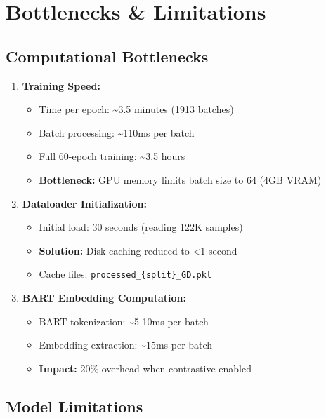 \documentclass[12pt,a4paper]{article}
\begin{document}
\section{Bottlenecks \& Limitations}

\subsection{Computational Bottlenecks}

\begin{enumerate}
    \item \textbf{Training Speed:}
    \begin{itemize}
        \item Time per epoch: \textasciitilde3.5 minutes (1913 batches)
        \item Batch processing: \textasciitilde110ms per batch
        \item Full 60-epoch training: \textasciitilde3.5 hours
        \item \textbf{Bottleneck:} GPU memory limits batch size to 64 (4GB VRAM)
    \end{itemize}
    
    \item \textbf{Dataloader Initialization:}
    \begin{itemize}
        \item Initial load: 30 seconds (reading 122K samples)
        \item \textbf{Solution:} Disk caching reduced to <1 second
        \item Cache files: \texttt{processed\_\{split\}\_GD.pkl}
    \end{itemize}
    
    \item \textbf{BART Embedding Computation:}
    \begin{itemize}
        \item BART tokenization: \textasciitilde5-10ms per batch
        \item Embedding extraction: \textasciitilde15ms per batch
        \item \textbf{Impact:} 20\% overhead when contrastive enabled
    \end{itemize}
\end{enumerate}

\subsection{Model Limitations}
\end{document}
